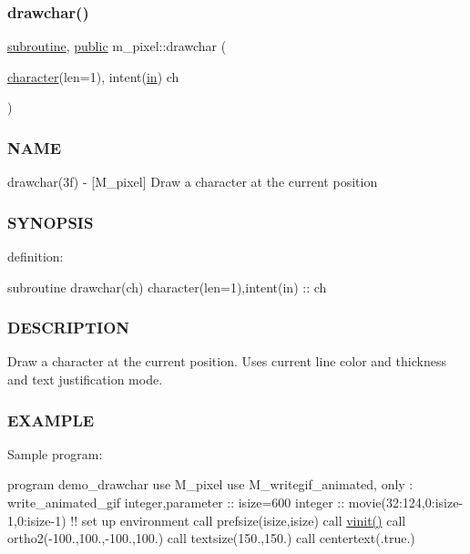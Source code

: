 \subsubsection{\texorpdfstring{drawchar()}{drawchar()}}
{\footnotesize\ttfamily \hyperlink{M__stopwatch_83_8txt_acfbcff50169d691ff02d4a123ed70482}{subroutine}, \hyperlink{M__stopwatch_83_8txt_a2f74811300c361e53b430611a7d1769f}{public} m\+\_\+pixel\+::drawchar (\begin{DoxyParamCaption}\item[{\hyperlink{option__stopwatch_83_8txt_abd4b21fbbd175834027b5224bfe97e66}{character}(len=1), intent(\hyperlink{M__journal_83_8txt_afce72651d1eed785a2132bee863b2f38}{in})}]{ch }\end{DoxyParamCaption})}



\subsubsection*{N\+A\+ME}

drawchar(3f) -\/ \mbox{[}M\+\_\+pixel\mbox{]} Draw a character at the current position 

\subsubsection*{S\+Y\+N\+O\+P\+S\+IS}

definition\+:

subroutine drawchar(ch) character(len=1),intent(in) \+:\+: ch

\subsubsection*{D\+E\+S\+C\+R\+I\+P\+T\+I\+ON}

Draw a character at the current position. Uses current line color and thickness and text justification mode.

\subsubsection*{E\+X\+A\+M\+P\+LE}

Sample program\+:

program demo\+\_\+drawchar use M\+\_\+pixel use M\+\_\+writegif\+\_\+animated, only \+: write\+\_\+animated\+\_\+gif integer,parameter \+:\+: isize=600 integer \+:\+: movie(32\+:124,0\+:isize-\/1,0\+:isize-\/1) !! set up environment call prefsize(isize,isize) call \hyperlink{namespacem__pixel_ac03ca8f23fdadb60599b6ea4dc87a6d9}{vinit()} call ortho2(-\/100.,100.,-\/100.,100.) call textsize(150.,150.) call centertext(.true.)

